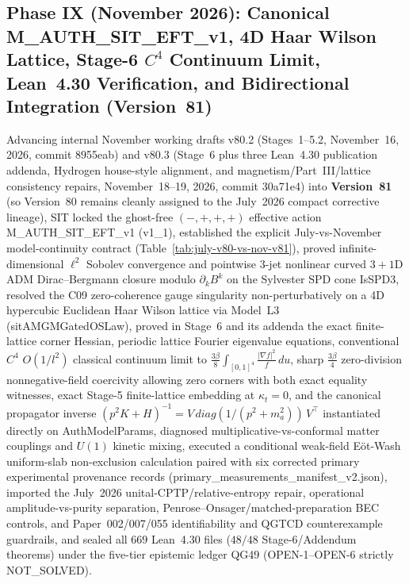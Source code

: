 \documentclass[american,11pt,letterpaper]{article}
\def\mathrm#1{#1}%
\def\texttt#1{#1}%
\begin{document}
\subsection{Phase IX (November 2026): Canonical \texttt{M\_AUTH\_SIT\_EFT\_v1}, 4D Haar Wilson Lattice, Stage-6 $C^4$ Continuum Limit, Lean~4.30 Verification, and Bidirectional Integration (Version~81)}
Advancing internal November working drafts v80.2 (Stages~1--5.2, November~16, 2026, commit \texttt{8955eab}) and v80.3 (Stage~6 plus three Lean~4.30 publication addenda, Hydrogen house-style alignment, and magnetism/Part~III/lattice consistency repairs, November~18--19, 2026, commit \texttt{30a71e4}) into \textbf{Version~81} (so Version~80 remains cleanly assigned to the July~2026 compact corrective lineage), SIT locked the ghost-free $(-,+,+,+)$ effective action \texttt{M\_AUTH\_SIT\_EFT\_v1} (\texttt{v1\_1}), established the explicit July-vs-November model-continuity contract (Table~\ref{tab:july-v80-vs-nov-v81}), proved infinite-dimensional $\ell^2$ Sobolev convergence and pointwise 3-jet nonlinear curved $3+1$D ADM Dirac--Bergmann closure modulo $\partial_k B^k$ on the Sylvester SPD cone \texttt{IsSPD3}, resolved the \texttt{C09} zero-coherence gauge singularity non-perturbatively on a 4D hypercubic Euclidean Haar Wilson lattice via Model~L3 (\texttt{sitAMGMGatedOSLaw}), proved in Stage~6 and its addenda the exact finite-lattice corner Hessian, periodic lattice Fourier eigenvalue equations, conventional $C^4$ $O(1/l^2)$ classical continuum limit to $\frac{3\beta}{8}\int_{[0,1]^4}\frac{|\nabla f|^2}{f}\,du$, sharp $\frac{3\beta}{4}$ zero-division nonnegative-field coercivity allowing zero corners with both exact equality witnesses, exact Stage-5 finite-lattice embedding at $\kappa_t = 0$, and the canonical propagator inverse $(p^2 K + H)^{-1} = V\,\mathrm{diag}(1/(p^2+m_a^2))\,V^\top$ instantiated directly on \texttt{AuthModelParams}, diagnosed multiplicative-vs-conformal matter couplings and $U(1)$ kinetic mixing, executed a conditional weak-field E\"ot-Wash uniform-slab non-exclusion calculation paired with six corrected primary experimental provenance records (\texttt{primary\_measurements\_manifest\_v2.json}), imported the July~2026 unital-CPTP/relative-entropy repair, operational amplitude-vs-purity separation, Penrose--Onsager/matched-preparation BEC controls, and Paper~002/007/055 identifiability and QGTCD counterexample guardrails, and sealed all $669$ Lean~4.30 files ($48/48$ Stage-6/Addendum theorems) under the five-tier epistemic ledger \texttt{QG49} (\texttt{OPEN-1}--\texttt{OPEN-6} strictly \texttt{NOT\_SOLVED}).
\end{document}
